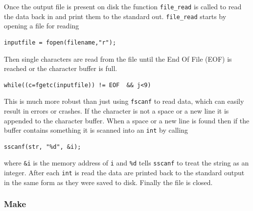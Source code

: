 \documentclass[11pt]{scrartcl}
\begin{document}
Once the output file is present on disk the function
\texttt{file\_read} is called to read the data back in and print them
to the standard out. \texttt{file\_read} starts by opening a file for
reading
\begin{lstlisting}
inputfile = fopen(filename,"r");
\end{lstlisting}
Then single characters are read from the file until the End Of File
(EOF) is reached or the character buffer is full.
\begin{lstlisting}
while((c=fgetc(inputfile)) != EOF  && j<9)
\end{lstlisting}
This is much more robust than just using \texttt{fscanf} to read data, which
can easily result in errors or crashes.  If the character is not a
space or a new line it is appended to the character buffer.  When a
space or a new line is found then if the buffer contains something it is
scanned into an \texttt{int} by calling
\begin{lstlisting}
sscanf(str, "%d", &i);
\end{lstlisting}
where \texttt{\&i} is the memory address of \texttt{i} and
\texttt{\%d} tells \texttt{sscanf} to treat the string as an integer.
After each \texttt{int} is read the data are printed back to the
standard output in the same form as they were saved to disk.  Finally
the file is closed.

\subsubsection{Make \label{section:make}}
\end{document}
